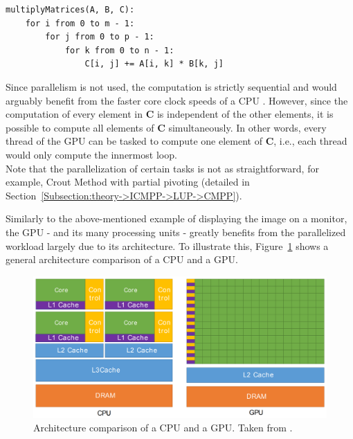 \begin{lstlisting}[caption={Pseudocode for the multiplication of two matrices.
Let $\mathbf{A}$ be a $m\times n$ matrix, $\mathbf{B}$ a $n\times p$ matrix, and $\mathbf{C}$ a $m\times p$ matrix.},label={Listing:theory->GPUs->GPGPUs->multiplication-of-matrices}]
multiplyMatrices(A, B, C):
	for i from 0 to m - 1:
		for j from 0 to p - 1:
			for k from 0 to n - 1:
				C[i, j] += A[i, k] * B[k, j]
\end{lstlisting}

Since parallelism is not used, the computation is strictly sequential and would arguably benefit from the faster core clock speeds of a CPU \cite{Cejka2022}.
However, since the computation of every element in $\mathbf{C}$ is independent of the other elements, it is possible to compute all elements of $\mathbf{C}$ simultaneously.
In other words, every thread of the GPU can be tasked to compute one element of $\mathbf{C}$, i.e., each thread would only compute the innermost loop.\\
Note that the parallelization of certain tasks is not as straightforward, for example, Crout Method with partial pivoting (detailed in Section~\ref{Subsection:theory->ICMPP->LUP->CMPP}).

Similarly to the above-mentioned example of displaying the image on a monitor, the GPU - and its many processing units - greatly benefits from the parallelized workload largely due to its architecture.
To illustrate this, Figure~\ref{Figure:theory->GPUs->GPGPU->CPU-nvidia-GPU-architecture-comparison} shows a general architecture comparison of a CPU and a GPU.

\begin{figure}[ht!]
	\centering
	\includegraphics[width=14cm, keepaspectratio]{images/ch01/nvidia_CPU_GPU_comparison.png}
	\caption{Architecture comparison of a CPU and a GPU.
		Taken from  \cite{NVIDIADecember2022}.
	}
	\label{Figure:theory->GPUs->GPGPU->CPU-nvidia-GPU-architecture-comparison}
\end{figure}

